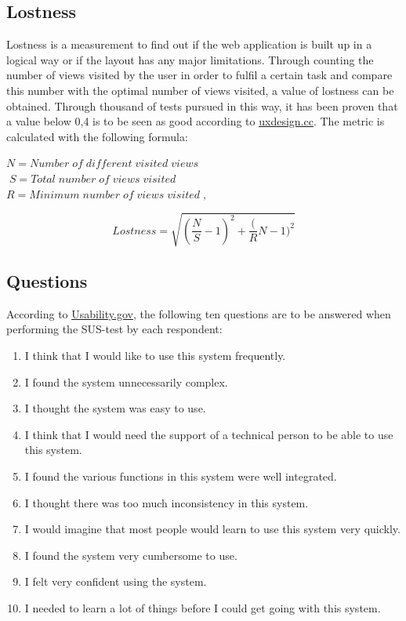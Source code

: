 \documentclass[12pt]{article}
\begin{document}
    \subsection{Lostness}
    \label{sec: lostness}
    Lostness is a measurement to find out if the web application is built up in a logical way or if the layout has any major limitations. Through counting the number of views visited by the user in order to fulfil a certain task and compare this number with the optimal number of views visited, a value of lostness can be obtained. Through thousand of tests pursued in this way, it has been proven that a value below 0,4 is to be seen as good according to \href{https://uxdesign.cc/ux-metric-lostness-524998ccb215}{\underline{uxdesign.cc}}. The metric is calculated with the following formula: \\
    \begin{center}
          $N = Number \; of \; different\; visited \; views$ \\ $\; S = Total \; number \; of \; views\;visited$ \\ $ R = Minimum \; number \; of \; views\;visited \;,$
    \end{center}
  
    \begin{equation}
        Lostness = \sqrt{(\frac{N}{S}-1)^2 + \frac({R}{N}-1)^2}
    \end{equation}
    
    \subsection{Questions}
    \label{ref: Questions}
    
    According to \href{https://www.usability.gov/how-to-and-tools/methods/system-usability-scale.html}{\underline{Usability.gov}}, the following ten questions are to be answered when performing the SUS-test by each respondent: 
    
    \begin{enumerate}
        \item I think that I would like to use this system frequently.
        \item I found the system unnecessarily complex.
        \item I thought the system was easy to use.
        \item I think that I would need the support of a technical person to be able to use this system.
        \item I found the various functions in this system were well integrated.
        \item I thought there was too much inconsistency in this system.
        \item I would imagine that most people would learn to use this system very quickly.
        \item I found the system very cumbersome to use.
        \item I felt very confident using the system.
        \item I needed to learn a lot of things before I could get going with this system.
    \end{enumerate}
\end{document}
